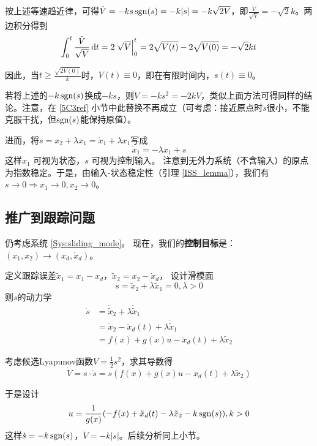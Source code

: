   按上述等速趋近律，可得$\dot{V} = - ks \operatorname{sgn} (s) = - k | s | =
  - k \sqrt{2 V}$，即$\frac{\dot{V}}{\sqrt{V}} = - \sqrt{2} k $。两边积分得到
  \[ \int^t_0 \frac{\dot{V}}{\sqrt{V}} \mathop{}\!\mathrm{d} t = 2 \left. \sqrt{V} \right|^t_0 = 2
   \sqrt{V (t)} - 2 \sqrt{V (0)}  = - \sqrt{2} k  t \]
  
  因此，当$t \geq \frac{\sqrt{2 V (0)}}{k}$时，$V (t) \equiv 0$，即在有限时间内，$s (t) \equiv 0$。

  \begin{note}
    若将上述的$-k\operatorname{sgn}(s)$换成$-ks$，则$\dot{V} = - ks^2=  - 2k V$，类似上面方法可得同样的结论。注意，在 \ref{5C3ref} 小节中此替换不再成立（可考虑：接近原点时$s$很小，不能克服干扰，但$\operatorname{sgn}(s)$能保持原值）。
  \end{note}

  进而，将$s = x_2 + \lambda x_1 = \dot{x}_1 + \lambda x_1$写成
  \[ \dot{x}_1 = - \lambda x_1 + s \]
  这样$x_1$ 可视为状态，$s$ 可视为控制输入。
  注意到无外力系统（不含输入）的原点为指数稳定。于是，由输入-状态稳定性（引理 \ref{ISS_lemma}），我们有$s \rightarrow 0 \Rightarrow x_1 \rightarrow 0, x_2 \rightarrow 0$。

\subsection{推广到跟踪问题}

仍考虑系统 \eqref{Sys:sliding_mode}。
现在，我们的{\bf 控制目标}是：$(x_1, x_2) \rightarrow (x_d, \dot{x}_d)$。

定义跟踪误差$\tilde{x}_1 = x_1 - x_d$，$\tilde{x}_2 = x_2 - \dot{x}_d$，
设计滑模面\[s = \tilde{x}_2 + \lambda \tilde{x}_1 = 0,\lambda>0\]
则$s$的动力学
\begin{align*}
\dot{s} &= \dot{\tilde{x}}_2 + \lambda \dot{\tilde{x}}_1 \\
&= \dot{x}_2 -\ddot{x}_d (t) + \lambda \dot{\tilde{x}}_1 \\
&= f (x) + g (x) u - \ddot{x}_d (t) +\lambda \tilde{x}_2
\end{align*}

考虑候选Lyapunov函数$V = \frac{1}{2} s^2$，求其导数得
\[\dot{V} = s \cdot \dot{s} = s (f (x) + g (x) u -
\ddot{x}_d (t) + \lambda \tilde{x}_2)\]

于是设计\begin{equation}
    u = \frac{1}{g (x)} (- f (x) + \ddot{x}_d (t) - \lambda \tilde{x}_2 - k
\operatorname{sgn} (s)),k>0\label{tracking_control}
\end{equation}这样$\dot{s} = - k \operatorname{sgn} (s)$，$\dot{V}=-k|s|$。后续分析同上小节。

